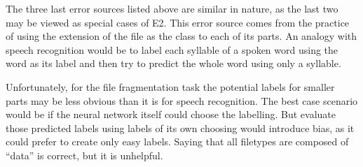 The three last error sources listed above are similar in nature, as the last two may be viewed as special cases of E2. This error source comes from the practice of using the extension of the file as the class to each of its parts. An analogy with speech recognition would be to label each syllable of a spoken word using the word as its label and then try to predict the whole word using only a syllable.

Unfortunately, for the file fragmentation task the potential labels for smaller parts may be less obvious than it is for speech recognition. The best case scenario would be if the neural network itself could choose the labelling. But evaluate those predicted labels using labels of its own choosing would introduce bias, as it could prefer to create only easy labels. Saying that all filetypes are composed of ``data'' is correct, but it is unhelpful.






